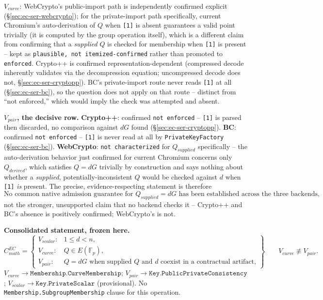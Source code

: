 \documentclass[11pt,a4paper]{article}
\begin{document}
\textbf{$V_{curve}$}: WebCrypto's public-import path is independently confirmed explicit (\S\ref{sec:ec-ser-webcrypto}); for the private-import path specifically, current Chromium's auto-derivation of $Q$ when \texttt{[1]} is absent guarantees a valid point trivially (it is computed by the group operation itself), which is a different claim from confirming that a \emph{supplied} $Q$ is checked for membership when \texttt{[1]} is present -- kept as \texttt{plausible, not itemized-confirmed} rather than promoted to \texttt{enforced}. Crypto++ is confirmed representation-dependent (compressed decode inherently validates via the decompression equation; uncompressed decode does not, \S\ref{sec:ec-ser-cryptopp}). BC's private-import route never reads \texttt{[1]} at all (\S\ref{sec:ec-ser-bc}), so the question does not apply on that route -- distinct from ``not enforced,'' which would imply the check was attempted and absent.

\textbf{$V_{pair}$, the decisive row.} \textbf{Crypto++}: confirmed \texttt{not enforced} -- \texttt{[1]} is parsed then discarded, no comparison against $dG$ found (\S\ref{sec:ec-ser-cryptopp}). \textbf{BC}: confirmed \texttt{not enforced} -- \texttt{[1]} is never read at all by \texttt{PrivateKeyFactory} (\S\ref{sec:ec-ser-bc}). \textbf{WebCrypto}: \texttt{not characterized} for $Q_{supplied}$ specifically -- the auto-derivation behavior just confirmed for current Chromium concerns only $Q_{derived}$, which satisfies $Q=dG$ trivially by construction and says nothing about whether a \emph{supplied}, potentially-inconsistent $Q$ would be checked against $d$ when \texttt{[1]} \emph{is} present. The precise, evidence-respecting statement is therefore
\[
\text{No common native admission guarantee for } Q_{supplied}=dG \text{ has been established across the three backends,}
\]
not the stronger, unsupported claim that no backend checks it -- Crypto++ and BC's absence is positively confirmed; WebCrypto's is not.

\textbf{Consolidated statement, frozen here.}
\[
C_{math}^{EC} = \left\{
\begin{array}{ll}
V_{scalar}: & 1\le d<n, \\
V_{curve}: & Q\in E(\mathbb{F}_p), \\
V_{pair}: & Q=dG \text{ when supplied } Q \text{ and } d \text{ coexist in a contractual artifact,}
\end{array}
\right\}
\qquad V_{curve} \not\equiv V_{pair}.
\]
$V_{curve} \to \texttt{Membership.CurveMembership}$; $V_{pair} \to \texttt{Key.PublicPrivateConsistency}$; $V_{scalar} \to \texttt{Key.PrivateScalar}$ (provisional). No \texttt{Membership.SubgroupMembership} clause for this operation.
\end{document}
